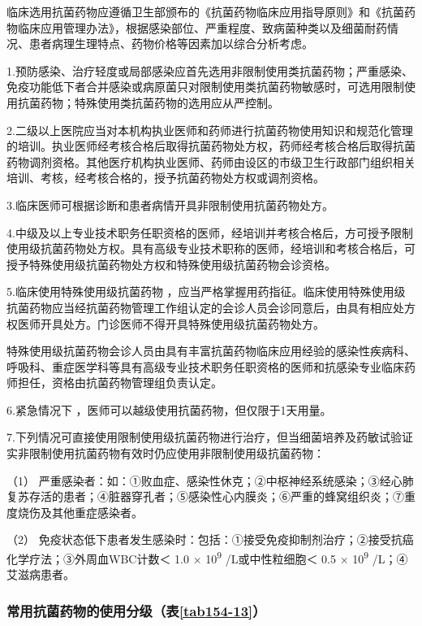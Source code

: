 临床选用抗菌药物应遵循卫生部颁布的《抗菌药物临床应用指导原则》和《抗菌药物临床应用管理办法》，根据感染部位、严重程度、致病菌种类以及细菌耐药情况、患者病理生理特点、药物价格等因素加以综合分析考虑。

1.预防感染、治疗轻度或局部感染应首先选用非限制使用类抗菌药物；严重感染、免疫功能低下者合并感染或病原菌只对限制使用类抗菌药物敏感时，可选用限制使用抗菌药物；特殊使用类抗菌药物的选用应从严控制。

2.二级以上医院应当对本机构执业医师和药师进行抗菌药物使用知识和规范化管理的培训。执业医师经考核合格后取得抗菌药物处方权，药师经考核合格后取得抗菌药物调剂资格。其他医疗机构执业医师、药师由设区的市级卫生行政部门组织相关培训、考核，经考核合格的，授予抗菌药物处方权或调剂资格。

3.临床医师可根据诊断和患者病情开具非限制使用抗菌药物处方。

4.中级及以上专业技术职务任职资格的医师，经培训并考核合格后，方可授予限制使用级抗菌药物处方权。具有高级专业技术职称的医师，经培训和考核合格后，可授予特殊使用级抗菌药物处方权和特殊使用级抗菌药物会诊资格。

5.临床使用特殊使用级抗菌药物
，应当严格掌握用药指征。临床使用特殊使用级抗菌药物应当经抗菌药物管理工作组认定的会诊人员会诊同意后，由具有相应处方权医师开具处方。门诊医师不得开具特殊使用级抗菌药物处方。

特殊使用级抗菌药物会诊人员由具有丰富抗菌药物临床应用经验的感染性疾病科、呼吸科、重症医学科等具有高级专业技术职务任职资格的医师和抗感染专业临床药师担任，资格由抗菌药物管理组负责认定。

6.紧急情况下 ，医师可以越级使用抗菌药物，但仅限于1天用量。

7.下列情况可直接使用限制使用级抗菌药物进行治疗，但当细菌培养及药敏试验证实非限制使用抗菌药物有效时仍应使用非限制使用级抗菌药物：

（1）
严重感染者：如：①败血症、感染性休克；②中枢神经系统感染；③经心肺复苏存活的患者；④脏器穿孔者；⑤感染性心内膜炎；⑥严重的蜂窝组织炎；⑦重度烧伤及其他重症感染者。

（2）
免疫状态低下患者发生感染时：包括：①接受免疫抑制剂治疗；②接受抗癌化学疗法；③外周血WBC计数＜
1.0 × 10\textsuperscript{9} /L或中性粒细胞＜ 0.5 × 10\textsuperscript{9}
/L；④艾滋病患者。

\subsubsection{常用抗菌药物的使用分级（表\ref{tab154-13}）}

